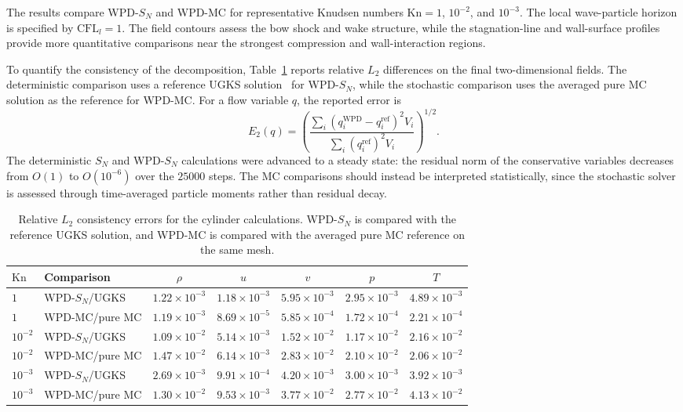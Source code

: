 \documentclass[preprint,12pt]{elsarticle}
\begin{document}
The results compare WPD-\(S_N\) and WPD-MC for representative Knudsen numbers \(\mathrm{Kn}=1\), \(10^{-2}\), and \(10^{-3}\). The local wave-particle horizon is specified by \(\mathrm{CFL}_l=1\). The field contours assess the bow shock and wake structure, while the stagnation-line and wall-surface profiles provide more quantitative comparisons near the strongest compression and wall-interaction regions.

To quantify the consistency of the decomposition, Table~\ref{tab:cylinder_consistency_error} reports relative \(L_2\) differences on the final two-dimensional fields. The deterministic comparison uses a reference UGKS solution~\cite{huang2012ugks} for WPD-\(S_N\), while the stochastic comparison uses the averaged pure MC solution as the reference for WPD-MC. For a flow variable \(q\), the reported error is
\[
E_2(q)=
\left(
\frac{\sum_i (q_i^{\mathrm{WPD}}-q_i^{\mathrm{ref}})^2 V_i}
{\sum_i (q_i^{\mathrm{ref}})^2 V_i}
\right)^{1/2}.
\]
The deterministic \(S_N\) and WPD-\(S_N\) calculations were advanced to a steady state: the residual norm of the conservative variables decreases from \(O(1)\) to \(O(10^{-6})\) over the \(25000\) steps. The MC comparisons should instead be interpreted statistically, since the stochastic solver is assessed through time-averaged particle moments rather than residual decay.

\begin{table}[!htbp]
\centering
\caption{Relative \(L_2\) consistency errors for the cylinder calculations. WPD-\(S_N\) is compared with the reference UGKS solution, and WPD-MC is compared with the averaged pure MC reference on the same mesh.}
\label{tab:cylinder_consistency_error}
\small
\begin{tabular}{llccccc}
\toprule
\(\mathrm{Kn}\) & Comparison & \(\rho\) & \(u\) & \(v\) & \(p\) & \(T\) \\
\midrule
\(1\) & WPD-\(S_N\)/UGKS & \(1.22\times10^{-3}\) & \(1.18\times10^{-3}\) & \(5.95\times10^{-3}\) & \(2.95\times10^{-3}\) & \(4.89\times10^{-3}\) \\
\(1\) & WPD-MC/pure MC & \(1.19\times10^{-3}\) & \(8.69\times10^{-5}\) & \(5.85\times10^{-4}\) & \(1.72\times10^{-4}\) & \(2.21\times10^{-4}\) \\
\(10^{-2}\) & WPD-\(S_N\)/UGKS & \(1.09\times10^{-2}\) & \(5.14\times10^{-3}\) & \(1.52\times10^{-2}\) & \(1.17\times10^{-2}\) & \(2.16\times10^{-2}\) \\
\(10^{-2}\) & WPD-MC/pure MC & \(1.47\times10^{-2}\) & \(6.14\times10^{-3}\) & \(2.83\times10^{-2}\) & \(2.10\times10^{-2}\) & \(2.06\times10^{-2}\) \\
\(10^{-3}\) & WPD-\(S_N\)/UGKS & \(2.69\times10^{-3}\) & \(9.91\times10^{-4}\) & \(4.20\times10^{-3}\) & \(3.00\times10^{-3}\) & \(3.92\times10^{-3}\) \\
\(10^{-3}\) & WPD-MC/pure MC & \(1.30\times10^{-2}\) & \(9.53\times10^{-3}\) & \(3.77\times10^{-2}\) & \(2.77\times10^{-2}\) & \(4.13\times10^{-2}\) \\
\bottomrule
\end{tabular}
\end{table}
\end{document}
